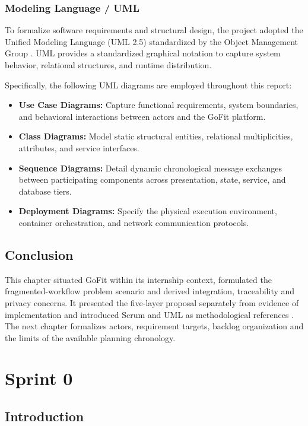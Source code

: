 \documentclass[12pt,a4paper,openany]{report}
\begin{document}
\subsection{Modeling Language / UML}


To formalize software requirements and structural design, the project adopted the Unified Modeling Language (UML 2.5) standardized by the Object Management Group \cite{omg2015uml, booch2005uml}. UML provides a standardized graphical notation to capture system behavior, relational structures, and runtime distribution.

Specifically, the following UML diagrams are employed throughout this report:
\begin{itemize}
    \item \textbf{Use Case Diagrams:} Capture functional requirements, system boundaries, and behavioral interactions between actors and the GoFit platform.
    \item \textbf{Class Diagrams:} Model static structural entities, relational multiplicities, attributes, and service interfaces.
    \item \textbf{Sequence Diagrams:} Detail dynamic chronological message exchanges between participating components across presentation, state, service, and database tiers.
    \item \textbf{Deployment Diagrams:} Specify the physical execution environment, container orchestration, and network communication protocols.
\end{itemize}

\section*{Conclusion}


This chapter situated GoFit within its internship context, formulated the fragmented-workflow problem scenario and derived integration, traceability and privacy concerns. It presented the five-layer proposal separately from evidence of implementation and introduced Scrum and UML as methodological references \cite{scrumguide2020,omg2015uml}. The next chapter formalizes actors, requirement targets, backlog organization and the limits of the available planning chronology.

\chapter{Sprint 0}


\section*{Introduction}
\end{document}
